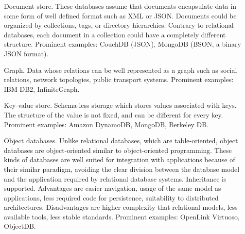 \documentclass[a4paper,10pt]{article}
\begin{document}
\vspace{3mm}


Document store. These databases assume that documents encapsulate data in some form of well defined
format such as XML or JSON. Documents could be organized by collections, tags, or directory hierarchies.
Contrary to relational databases, each document in a collection could have a completely different
structure.
Prominent examples: CouchDB (JSON), MongoDB (BSON, a binary JSON format).

Graph. Data whose relations can be well represented as a graph such as social relations,
network topologies, public transport systems.
Prominent examples: IBM DB2, InfiniteGraph.

Key-value store. Schema-less storage which stores values associated with keys. The structure of the
value is not fixed, and can be different for every key.
Prominent examples: Amazon DynamoDB, MongoDB, Berkeley DB.

Object databases. Unlike relational databases, which are table-oriented, object databases are
object-oriented similar to object-oriented programming. These kinds of databases are well suited
for integration with applications because of their similar paradigm, avoiding the clear division
between the database model and the application required by relational database systems.
Inheritance is supported. Advantages are easier navigation, usage of the same model as applications, less
required code for persistence, suitability to distributed architectures. Disadvantages are
higher complexity that relational models, less available tools, less stable standards.
Prominent examples: OpenLink Virtuoso, ObjectDB.
\end{document}
